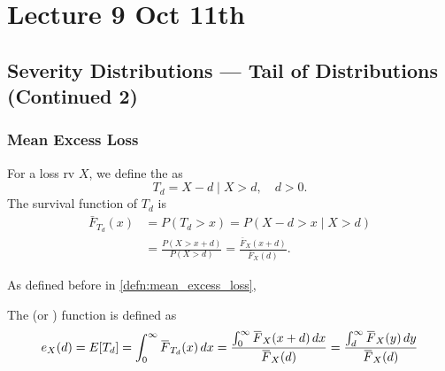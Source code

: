 \documentclass[notoc,notitlepage]{tufte-book}
\begin{document}




\chapter{Lecture 9 Oct 11th}%
\label{chp:lecture_9_oct_11th}

\section{Severity Distributions --- Tail of Distributions (Continued 2)}%
\label{sec:severity_distributions_tail_of_distributions_continued_2}

\subsection{Mean Excess Loss}%
\label{sub:mean_excess_loss}

\begin{defn}\label{defn:excess_loss_random_variable}
  For a loss rv $X$, we define the  as
  \begin{equation*}
    T_d = X - d \mid X > d, \quad d > 0.
  \end{equation*}
  The survival function of $T_d$ is
  \begin{align*}
    \bar{F}_{T_d}(x) &= P(T_d > x) = P(X - d > x \mid X > d) \\
                     &= \frac{P(X > x + d)}{P(X > d)} = \frac{\bar{F}_X(x + d)}{\bar{F}_X(d)}.
  \end{align*}
\end{defn}

As defined before in \cref{defn:mean_excess_loss},

\begin{defnnonum}
  The  (or ) function is defined as
  \begin{equation*}
    e_X(d) = E[T_d] = \int_{0}^{\infty} \bar{F}_{T_d}(x) \dif{x} = \frac{\int_{0}^{\infty} \bar{F}_X(x + d) \dif{x}}{\bar{F}_X(d)} = \frac{\int_{d}^{\infty} \bar{F}_X(y) \dif{y} }{\bar{F}_X(d)}
  \end{equation*}
\end{defnnonum}
\end{document}
